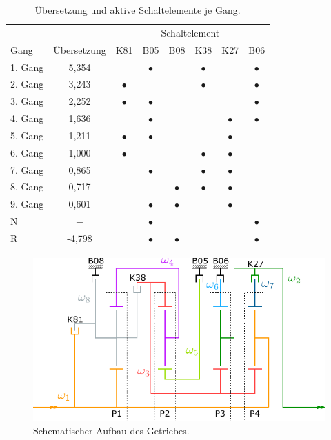 \begin{table}
	\caption{Übersetzung und aktive Schaltelemente je Gang.}
	\label{tbl:clutches}
	\centering
	\begin{tabular}{l*{7}{c}} 
		\toprule
		& & \multicolumn{6}{c}{Schaltelement} \\
		\cmidrule{3-8}
		Gang & Übersetzung & K81 & B05 & B08 & K38 & K27 & B06 \\
		\midrule 
		1. Gang & 5,354 &           & $\bullet$ &           & $\bullet$ &           & $\bullet$ \\
		2. Gang & 3,243 & $\bullet$ &           &           & $\bullet$ &           & $\bullet$ \\
		3. Gang & 2,252 & $\bullet$ & $\bullet$ &           &           &           & $\bullet$ \\
		4. Gang & 1,636 &           & $\bullet$ &           &           & $\bullet$ & $\bullet$ \\
		5. Gang & 1,211 & $\bullet$ & $\bullet$ &           &           & $\bullet$ &           \\
		6. Gang & 1,000 & $\bullet$ &           &           & $\bullet$ & $\bullet$ &           \\
		7. Gang & 0,865 &           & $\bullet$ &           & $\bullet$ & $\bullet$ &           \\
		8. Gang & 0,717 &           &           & $\bullet$ & $\bullet$ & $\bullet$ &           \\
		9. Gang & 0,601 &           & $\bullet$ & $\bullet$ &           & $\bullet$ &           \\
		N       & $-$   &           & $\bullet$ &           &           &           & $\bullet$ \\
		R       & -4,798&           & $\bullet$ & $\bullet$ &           &           & $\bullet$ \\
		\bottomrule 
	\end{tabular} 
\end{table}

\begin{figure}
	\centering    %
	\includegraphics[scale=1]{figures/02_Modellierung/gearbox_schematic_color_with_labels.pdf}
	\caption{Schematischer Aufbau des Getriebes.}
	\label{fig:gearbox} %
\end{figure}

